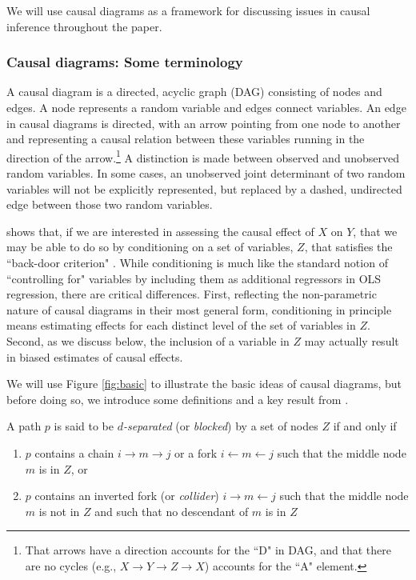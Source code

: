 \documentclass[11pt,reqno]{amsart}
\begin{document}
We will use causal diagrams as a framework for discussing issues in causal inference throughout the paper.

\subsubsection{Causal diagrams: Some terminology}
A causal diagram is a directed, acyclic graph (DAG) consisting of nodes and edges.
A node represents a random variable and edges connect variables.
An edge in causal diagrams is directed, with an arrow pointing from one node to another and representing a causal relation between these variables running in the direction of the arrow.\footnote{
That arrows have a direction accounts for the ``D" in DAG, and that there are no cycles (e.g., $X \rightarrow Y \rightarrow Z \rightarrow X$) accounts for the ``A" element.}
A distinction is made between observed and unobserved random variables.
In some cases, an unobserved joint determinant of two random variables will not be explicitly represented, but replaced by a dashed, undirected edge between those two random variables.

\citet{Pearl:2009vo} shows that, if we are interested in assessing the causal effect of $X$ on $Y$, that we may be able to do so by conditioning on a set of variables, $Z$, that satisfies the ``back-door criterion" \citep[p.79]{Pearl:2009vo}.
While conditioning is much like the standard notion of ``controlling for" variables by including them as additional regressors in OLS regression, there are critical differences.
First, reflecting the non-parametric nature of causal diagrams in their most general form, conditioning in principle means estimating effects for each distinct level of the set of variables in $Z$.
Second, as we discuss below, the inclusion of a variable in $Z$ may actually result in biased estimates of causal effects. 	

We will use Figure \ref{fig:basic} to illustrate the basic ideas of causal diagrams, but before doing so, we introduce some definitions and a key result from \citet{Pearl:2009vo}.

\begin{definition}
A path $p$ is said to be \emph{$d$-separated} (or \emph{blocked}) by a set of nodes $Z$ if and only if
\begin{enumerate}
	\item $p$ contains a chain $i \rightarrow m \rightarrow j$ or a fork $i \leftarrow m \leftarrow j$ such that the middle node $m$ is in $Z$, or
	\item $p$ contains an inverted fork (or \emph{collider}) $i \rightarrow m \leftarrow j$ such that the middle node $m$ is not in $Z$ and such that no descendant of $m$ is in $Z$
\end{enumerate}
\end{definition}
\end{document}
